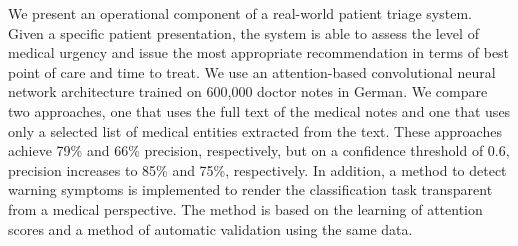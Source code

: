 We present an operational component of a real-world patient triage system. Given a specific patient presentation, the system is able to assess the level of medical urgency and issue the most appropriate recommendation in terms of best point of care and time to treat. We use an attention-based convolutional neural network architecture trained on 600,000 doctor notes in German. We compare two approaches, one that uses the full text of the medical notes and one that uses only a selected list of medical entities extracted from the text. These approaches achieve 79\% and 66\% precision, respectively, but on a confidence threshold of 0.6, precision increases to 85\% and 75\%, respectively. In addition, a method to detect warning symptoms is implemented to render the classification task transparent from a medical perspective. The method is based on the learning of attention scores and a method of automatic validation using the same data.
